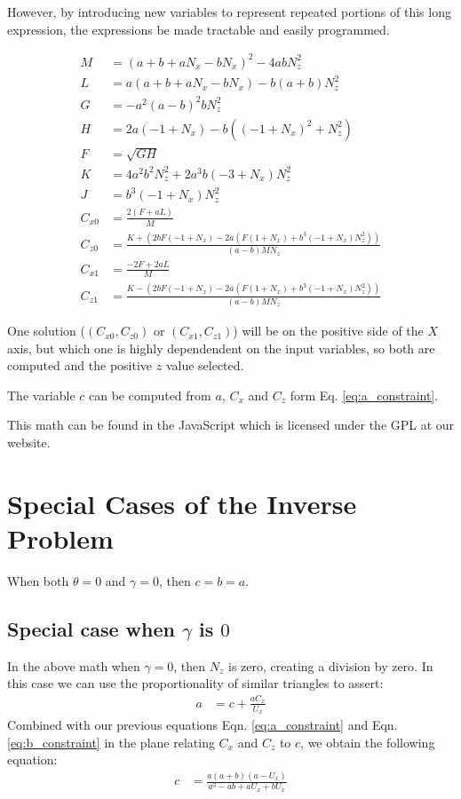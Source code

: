 \documentclass{article}
\begin{document}
However, by introducing new variables to represent repeated
portions of this long expression, the expressions be
made tractable and easily programmed.

\begin{align}
M &= (a + b + a N_x - b N_x)^2 - 4 a b N_z^2 \\
L &= a (a + b + a N_x - b N_x) - b (a + b) N_z^2 \\
G &= -a^2 (a - b)^2 b N_z^2 \\
H &= 2 a (-1 + N_x) - b ((-1 + N_x)^2 + N_z^2) \\
F &= \sqrt{G H} \\
K &= 4 a^2 b^2 N_z^2 + 2 a^3 b (-3 + N_x) N_z^2 \\
J &= b^3 (-1 + N_x) N_z^2 \\
C_{x0} &= \frac{2 (F + a L)}{M} \\
C_{z0} &= \frac{K + (2 b F (-1 + N_x) -
  2 a (F (1 + N_x) + b^3 (-1 + N_x) N_z^2))}
{(a -  b) M N_z} \\
C_{x1} &= \frac{-2 F + 2 a L}{M} \\
  C_{z1} &= \frac{K - (2 b F (-1 + N_x) -
  2 a (F (1 + N_x) + b^3 (-1 + N_x) N_z^2))}
  {(a - b) M N_z}
\end{align}

One solution ($(C_{x0},C_{z0})$ or $(C_{x1},C_{z1})$) will be on the
positive side of the $X$ axis, but which one is highly dependendent
on the input variables, so both are computed and the positive $z$
value selected.

The variable $c$ can be computed from $a$, $C_x$ and $C_z$
form Eq. \ref{eq:a_constraint}.

This math can be found in the JavaScript which is licensed
under the GPL\cite{gplv3} at our website\cite{softrobotcalc}.

\section{Special Cases of the Inverse Problem}

When both $\theta = 0$ and $\gamma = 0$, then $c = b = a$.

\subsection{Special case when $\gamma$ is $0$ }

In the above math when $\gamma = 0$, then $N_z$ is zero,
creating a division by zero.
In this case we can use the proportionality of similar
triangles to assert:
\begin{align}
  a &= c + \frac{a C_x}{U_x}
\end{align}
Combined with our previous equations
Eqn. \ref{eq:a_constraint} and Eqn. \ref{eq:b_constraint} in the plane
relating $C_x$ and $C_z$ to $c$,
we obtain the following equation:
\begin{align}
c & = \frac{a (a + b) (a - U_x)}{a^2 - a b + a U_x + b U_x}
\end{align}
\end{document}
